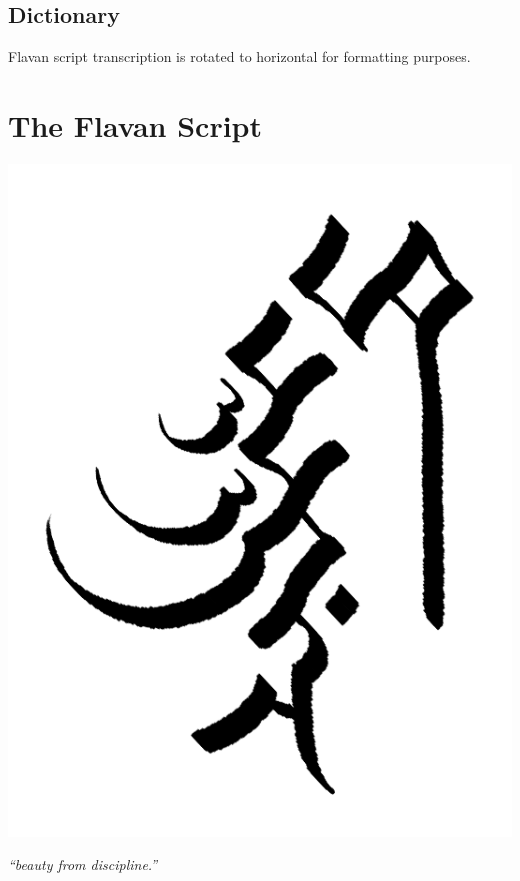 \documentclass[10pt,oneside]{memoir}
\begin{document}
\pagebreak

\section{Dictionary}

Flavan script transcription is rotated to horizontal for formatting purposes.

\begin{multicols}{3}

\end{multicols}


\chapter{The Flavan Script}\label{script}

\begin{center}
    \hspace{-60pt} \includegraphics[scale=2.1]{scriptchapter.png}

    \emph{``beauty from discipline.''}
\end{center}
\end{document}
